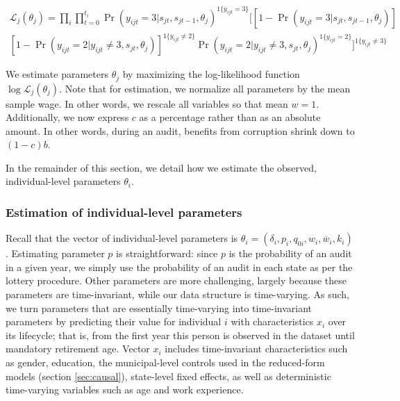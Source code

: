 \documentclass[12pt,a4paper]{article}
\theoremstyle{definition}
\newcommand{\wb}{\overline{w}}
\begin{document}
{\begin{align*}
    \mathcal{L}_j(\theta_j) = \prod_i \prod_{t=0}^{t_i}  
    \Pr(y_{ijt} = 3 | s_{jt}, s_{jt-1}, \theta_j)^{1\{y_{ijt} = 3\}}
    \biggl[ 
        [1-\Pr(y_{ijt} = 3 | s_{jt}, s_{jt-1}, \theta_j)] \\ 
    [1-\Pr(y_{ijt} = 2 | y_{ijt} \neq 3, s_{jt}, \theta_j)]^{1\{y_{ijt} \neq 2\}} 
    \Pr(y_{ijt} = 2 | y_{ijt} \neq 3, s_{jt}, \theta_j)^{1\{y_{ijt} = 2\}} \biggr]^{1\{y_{ijt} \neq 3\}}
\end{align*}

We estimate parameters $\theta_j$ by maximizing the log-likelihood function $\log \mathcal{L}_j(\theta_j)$. Note that for estimation, we normalize all parameters by the mean sample wage. In other words, we rescale all variables so that mean $w = 1$. Additionally, we now express $c$ as a percentage rather than as an absolute amount. In other words, during an audit, benefits from corruption shrink down to $(1-c)b$.

In the remainder of this section, we detail how we estimate the observed, individual-level parameters $\theta_i$. 

\subsubsection{Estimation of individual-level parameters}

Recall that the vector of individual-level parameters is $\theta_i = (\delta_i, p_i, q_{0i}, w_i, \wb_i, k_i)$. Estimating parameter $p$ is straightforward: since $p$ is the probability of an audit in a given year, we simply use the probability of an audit in each state as per the lottery procedure. Other parameters are more challenging, largely because these parameters are time-invariant, while our data structure is time-varying. As such, we turn parameters that are essentially time-varying into time-invariant parameters by predicting their value for individual $i$ with characteristics $x_i$ over its lifecycle; that is, from the first year this person is observed in the dataset until mandatory retirement age. Vector $x_i$ includes time-invariant characteristics such as gender, education, the municipal-level controls used in the reduced-form models (section \ref{sec:causal}), state-level fixed effects, as well as deterministic time-varying variables such as age and work experience. 

}
\end{document}
